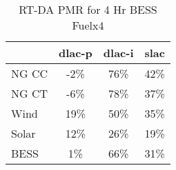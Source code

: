 \begin{table}[htbp]
\centering
\begin{tabular}{lccc}
\toprule
\hline
 & dlac-p & dlac-i & slac \\
\hline
\quad NG CC & -2\% & 76\% & 42\% \\
\quad NG CT & -6\% & 78\% & 37\% \\
\quad Wind & 19\% & 50\% & 35\% \\
\quad Solar & 12\% & 26\% & 19\% \\
\quad BESS & 1\% & 66\% & 31\% \\
\hline
\bottomrule
\end{tabular}
\caption{RT-DA PMR for 4 Hr BESS Fuelx4}
\label{tab:table4_4_Hr_BESS_Fuelx4}
\end{table}
